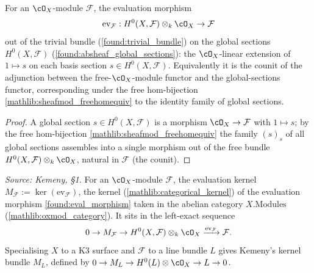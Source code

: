 \begin{definition}
  \label{found:eval_morphism}
  For an \(\cO_X\)-module \(\mathcal F\), the evaluation morphism
  \[
    \mathrm{ev}_{\mathcal F}:H^0(X,\mathcal F)\otimes_k\cO_X\to\mathcal F
  \]
  out of the trivial bundle (\cref{found:trivial_bundle}) on the global sections
  \(H^0(X,\mathcal F)\) (\cref{found:absheaf_global_sections}): the
  \(\cO_X\)-linear extension of \(1\mapsto s\) on each basis section
  \(s\in H^0(X,\mathcal F)\).  Equivalently it is the counit of the adjunction between
  the free-\(\cO_X\)-module functor and the global-sections functor, corresponding
  under the free hom-bijection \cref{mathlib:sheafmod_freehomequiv} to the identity
  family of global sections.
\end{definition}

\begin{proof}
  \leanok
  A global section \(s\in H^0(X,\mathcal F)\) is a morphism \(\cO_X\to\mathcal F\)
  with \(1\mapsto s\); by the free hom-bijection \cref{mathlib:sheafmod_freehomequiv}
  the family \((s)_{s}\) of all global sections assembles into a single morphism out
  of the free bundle \(H^0(X,\mathcal F)\otimes_k\cO_X\), natural in \(\mathcal F\)
  (the counit).
\end{proof}

\begin{definition}
  \label{found:eval_kernel_bundle}
  \textit{Source: Kemeny, \S1.}
  For an \(\cO_X\)-module \(\mathcal F\), the evaluation kernel
  \(M_{\mathcal F}:=\ker(\mathrm{ev}_{\mathcal F})\), the kernel
  (\cref{mathlib:categorical_kernel}) of the evaluation morphism
  \cref{found:eval_morphism} taken in the abelian category \(X.\mathrm{Modules}\)
  (\cref{mathlib:oxmod_category}).  It sits in the left-exact sequence
  \[
    0\to M_{\mathcal F}\to H^0(X,\mathcal F)\otimes_k\cO_X
       \xrightarrow{\mathrm{ev}_{\mathcal F}}\mathcal F .
  \]
  Specialising \(X\) to a K3 surface and \(\mathcal F\) to a line bundle \(L\) gives
  Kemeny's kernel bundle \(M_L\), defined by
  \(0\to M_L\to H^0(L)\otimes\cO_X\to L\to 0\).
\end{definition}

